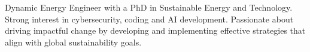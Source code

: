 
\begin{cvparagraph}

Dynamic Energy Engineer with a PhD in Sustainable Energy and Technology. Strong interest in cybersecurity, coding and AI development. Passionate about driving impactful change by developing and implementing effective strategies that align with global sustainability goals.

\end{cvparagraph}